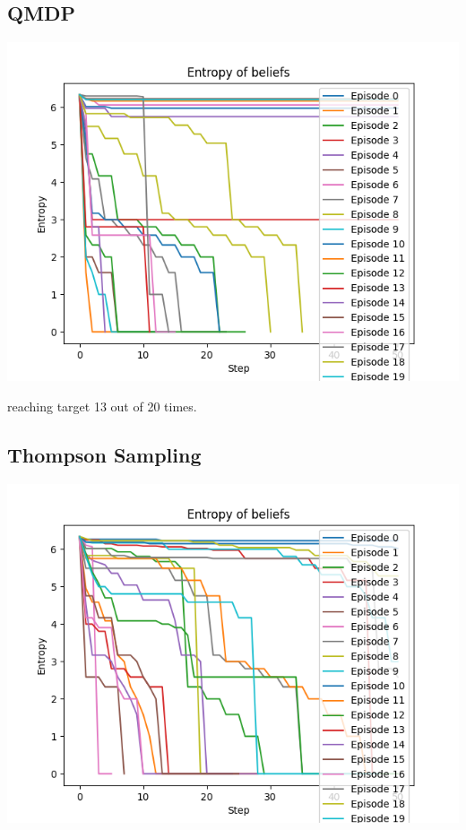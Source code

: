 \documentclass[12pt,a4paper]{article}
\begin{document}
\subsection{QMDP}

\begin{center}
\includegraphics[scale=0.7]{../src/plots/Qentropy_13out20.png}
\end{center}

reaching target 13 out of 20 times.

\subsection{Thompson Sampling}
\begin{center}
  \includegraphics[scale=0.7]{../src/plots/Thompsonentropy_14out20.png}
\end{center}
  
\end{document}
